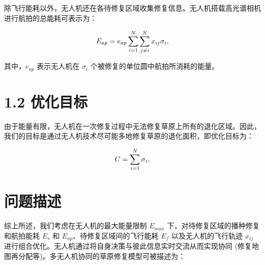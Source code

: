 \documentclass[AutoFakeBold]{LZUThesis}
\begin{document}
除飞行能耗以外，无人机还在各待修复区域收集修复信息。无人机搭载高光谱相机进行航拍的总能耗可表示为：

\begin{equation} \label{hyper-spectral-camera-energy}
	\begin{scriptsize}
		E_{ap} = e_{ap}\sum^N_{i=1}\sum^N_{j \neq i} x_{ij}\sigma_i,
	\end{scriptsize}
\end{equation}

其中，$e_{ap}$ 表示无人机在 $\sigma_i$ 个被修复的单位圆中航拍所消耗的能量。

\section{1.2 优化目标}

由于能量有限，无人机在一次修复过程中无法修复草原上所有的退化区域。因此，我们的目标是通过无人机技术尽可能多地修复草原的退化面积，即优化目标为：

\begin{equation} \label{maximize-the-sum}
	\begin{small}
		C = \sum^N_{i=1}\sigma_i,
	\end{small}
\end{equation}

\section{问题描述}

综上所述，我们考虑在无人机的最大能量限制 $E_{max}$ 下，对待修复区域的播种修复和航拍能耗 $E_s$ 和 $E_{ap}$、待修复区域间的飞行能耗 $E_f$ 以及无人机的飞行轨迹 $x_{ij}$ 进行组合优化。无人机通过将自身决策与彼此信息实时交流从而实现协同 (修复地图再分配等)。多无人机协同的草原修复模型可被描述为：
\end{document}
